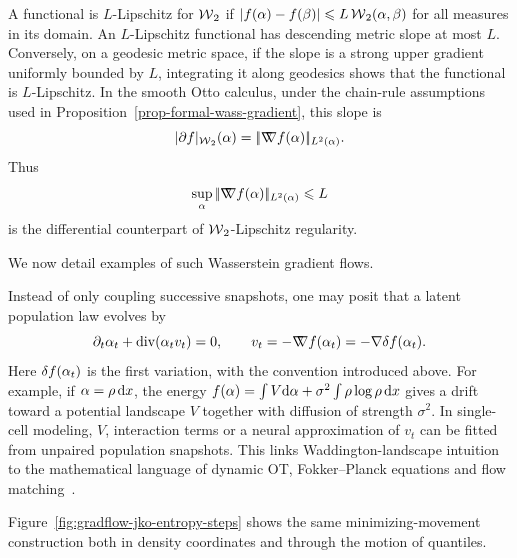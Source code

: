 \begin{rem}\label{rem-w2-lipschitz-bounded-gradient}
	A functional is $L$-Lipschitz for $\operatorname{\mathcal{W}}_2$ if $|f(\alpha)-f(\beta)|\leqslant L\operatorname{\mathcal{W}}_2(\alpha,\beta)$ for all measures in its domain. An \(L\)-Lipschitz functional has descending metric slope at most \(L\). Conversely, on a geodesic metric space, if the slope is a strong upper gradient uniformly bounded by \(L\), integrating it along geodesics shows that the functional is \(L\)-Lipschitz. In the smooth Otto calculus, under the chain-rule assumptions used in Proposition~\ref{prop-formal-wass-gradient}, this slope is
	\[
		|\partial f|_{\operatorname{\mathcal{W}}_2}(\alpha)
		=
		|\!| \mathord{\nabla\mkern-9.3mu\nabla} f(\alpha) |\!|_{L^2(\alpha)}.
	\]
	Thus
	\[
		\sup_{\alpha}|\!| \mathord{\nabla\mkern-9.3mu\nabla} f(\alpha) |\!|_{L^2(\alpha)}\leqslant L
	\]
	is the differential counterpart of \(\operatorname{\mathcal{W}}_2\)-Lipschitz regularity.
\end{rem}

We now detail examples of such Wasserstein gradient flows.

\begin{example}\label{ex-single-cell-gradient-flow}
	Instead of only coupling successive snapshots, one may posit that a latent population law evolves by
	\[
		\partial_t\alpha_t+\operatorname{div}(\alpha_t v_t)=0,
		\qquad
		v_t=-\mathord{\nabla\mkern-9.3mu\nabla} f(\alpha_t)=-\nabla\delta f(\alpha_t).
	\]
	Here \(\delta f(\alpha_t)\) is the first variation, with the convention introduced above. For example, if \(\alpha=\rho\,\mathrm{d} x\), the energy \(f(\alpha)=\int V\mathrm{d}\alpha+\sigma^2\int\rho\log\rho\,\mathrm{d} x\) gives a drift toward a potential landscape \(V\) together with diffusion of strength \(\sigma^2\). In single-cell modeling, \(V\), interaction terms or a neural approximation of \(v_t\) can be fitted from unpaired population snapshots. This links Waddington-landscape intuition to the mathematical language of dynamic OT, Fokker--Planck equations and flow matching~\citep{TongHuangWolfVanDijkKrishnaswamy2020TrajectoryNet,LavenantZhangKimSchiebinger2021TrajectoryInference,KleinUsciddaTheisCuturi2023GENOT}.
\end{example}

Figure~\ref{fig:gradflow-jko-entropy-steps} shows the same minimizing-movement construction both in density coordinates and through the motion of quantiles.

